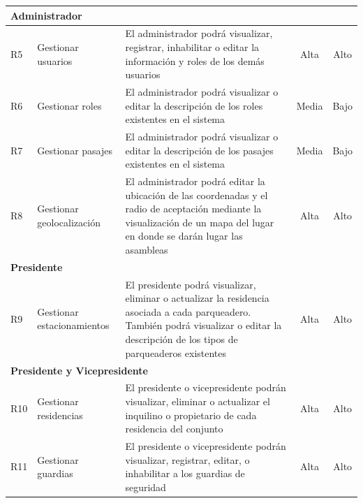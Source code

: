 \begin{spacing}{1}
\begin{center}
\begin{longtable}[l]{|p{}|p{}|p{}|p{}| p{}|}
            \hline
            \multicolumn{5}{|l|}{ \textbf{Administrador} } \\
            \hline
            R5          & Gestionar usuarios                                & El administrador podrá visualizar, registrar, inhabilitar o editar la información y roles de los demás usuarios  & \multicolumn{1}{c|}{Alta} & \multicolumn{1}{c|}{Alto}\\
            \hline
            R6          & Gestionar roles                                   & El administrador podrá visualizar o editar la descripción de los roles existentes en el sistema  & \multicolumn{1}{c|}{Media} & \multicolumn{1}{c|}{Bajo}\\
            \hline
            R7          & Gestionar pasajes                                 & El administrador podrá visualizar o editar la descripción de los pasajes existentes en el sistema  & \multicolumn{1}{c|}{Media} & \multicolumn{1}{c|}{Bajo}\\
            \hline
            R8          & Gestionar geolocalización                         & El administrador podrá editar la ubicación de las coordenadas y el radio de aceptación mediante la visualización de un mapa del lugar en donde se darán lugar las asambleas  & \multicolumn{1}{c|}{Alta} & \multicolumn{1}{c|}{Alto}\\
            \hline
            \multicolumn{5}{|l|}{ \textbf{Presidente} } \\
            \hline
            R9 & Gestionar estacionamientos & El presidente podrá visualizar, eliminar o actualizar la residencia asociada a cada parqueadero.
            También podrá visualizar o editar la descripción de los tipos de parqueaderos existentes & \multicolumn{1}{c|}{Alta} & \multicolumn{1}{c|}{Alto}\\
            \hline
            \multicolumn{5}{|l|}{ \textbf{Presidente y Vicepresidente} } \\
            \hline
            R10         & Gestionar residencias                             & El presidente o vicepresidente podrán visualizar, eliminar o actualizar el inquilino o propietario de cada residencia del conjunto & \multicolumn{1}{c|}{Alta} & \multicolumn{1}{c|}{Alto}\\
            \hline
            R11         & Gestionar guardias                                & El presidente o vicepresidente podrán visualizar, registrar, editar, o inhabilitar a los guardias de seguridad  & \multicolumn{1}{c|}{Alta} & \multicolumn{1}{c|}{Alto}\\

\end{longtable}
\end{center}
\end{spacing}
